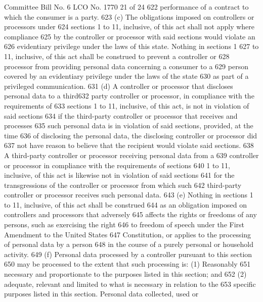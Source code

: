 Committee Bill No. 6
LCO No. 1770 21 of 24
622 performance of a contract to which the consumer is a party.
623 (c) The obligations imposed on controllers or processors under
624 sections 1 to 11, inclusive, of this act shall not apply where compliance
625 by the controller or processor with said sections would violate an
626 evidentiary privilege under the laws of this state. Nothing in sections 1
627 to 11, inclusive, of this act shall be construed to prevent a controller or
628 processor from providing personal data concerning a consumer to a
629 person covered by an evidentiary privilege under the laws of the state
630 as part of a privileged communication.
631 (d) A controller or processor that discloses personal data to a third632 party controller or processor, in compliance with the requirements of
633 sections 1 to 11, inclusive, of this act, is not in violation of said sections
634 if the third-party controller or processor that receives and processes
635 such personal data is in violation of said sections, provided, at the time
636 of disclosing the personal data, the disclosing controller or processor did
637 not have reason to believe that the recipient would violate said sections.
638 A third-party controller or processor receiving personal data from a
639 controller or processor in compliance with the requirements of sections
640 1 to 11, inclusive, of this act is likewise not in violation of said sections
641 for the transgressions of the controller or processor from which such
642 third-party controller or processor receives such personal data.
643 (e) Nothing in sections 1 to 11, inclusive, of this act shall be construed
644 as an obligation imposed on controllers and processors that adversely
645 affects the rights or freedoms of any persons, such as exercising the right
646 to freedom of speech under the First Amendment to the United States
647 Constitution, or applies to the processing of personal data by a person
648 in the course of a purely personal or household activity.
649 (f) Personal data processed by a controller pursuant to this section
650 may be processed to the extent that such processing is: (1) Reasonably
651 necessary and proportionate to the purposes listed in this section; and
652 (2) adequate, relevant and limited to what is necessary in relation to the
653 specific purposes listed in this section. Personal data collected, used or 

